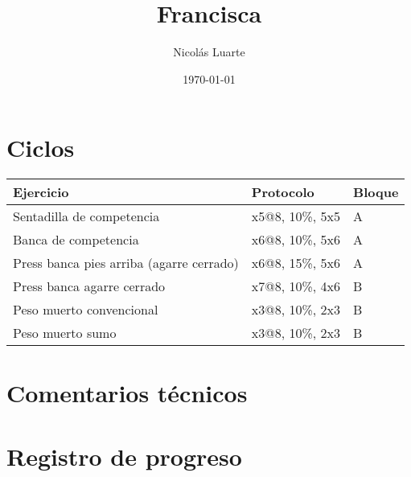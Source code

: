 \documentclass[11pt]{article}
\author{Nicolás Luarte}
\date{\today}
\title{Francisca}
\begin{document}
\maketitle
\tableofcontents

\section{Ciclos}
\label{sec:org0579ee1}
\begin{center}
\begin{tabular}{lll}
Ejercicio & Protocolo & Bloque\\
\hline
Sentadilla de competencia & x5@8, 10\%, 5x5 & A\\
Banca de competencia & x6@8, 10\%, 5x6 & A\\
Press banca pies arriba (agarre cerrado) & x6@8, 15\%, 5x6 & A\\
\hline
Press banca agarre cerrado & x7@8, 10\%, 4x6 & B\\
Peso muerto convencional & x3@8, 10\%, 2x3 & B\\
Peso muerto sumo & x3@8, 10\%, 2x3 & B\\
\hline
\end{tabular}
\end{center}
\section{Comentarios técnicos}
\label{sec:orgb32ed36}
\section{Registro de progreso}
\label{sec:org74b1d64}
\end{document}
